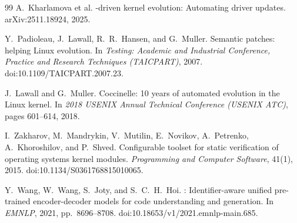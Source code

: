 \begin{thebibliography}{99}
A.~Kharlamova et al.
-driven kernel evolution: Automating driver updates.
\newblock arXiv:2511.18924, 2025.

Y.~Padioleau, J.~Lawall, R.~R.~Hansen, and G.~Muller.
\newblock Semantic patches: helping {Linux} evolution.
\newblock In \emph{Testing: Academic and Industrial Conference, Practice and Research Techniques (TAICPART)}, 2007.
\newblock doi:10.1109/TAICPART.2007.23.

J.~Lawall and G.~Muller.
\newblock Coccinelle: 10 years of automated evolution in the {Linux} kernel.
\newblock In \emph{2018 USENIX Annual Technical Conference (USENIX ATC)}, pages 601--614, 2018.

I.~Zakharov, M.~Mandrykin, V.~Mutilin, E.~Novikov, A.~Petrenko, A.~Khoroshilov, and P.~Shved.
\newblock Configurable toolset for static verification of operating systems kernel modules.
\newblock \emph{Programming and Computer Software}, 41(1), 2015.
\newblock doi:10.1134/S0361768815010065.

Y.~Wang, W.~Wang, S.~Joty, and S.~C.~H.~Hoi.
: Identifier-aware unified pre-trained encoder-decoder models for code understanding and generation.
\newblock In \emph{EMNLP}, 2021, pp.~8696--8708.
\newblock doi:10.18653/v1/2021.emnlp-main.685.

\end{thebibliography}
